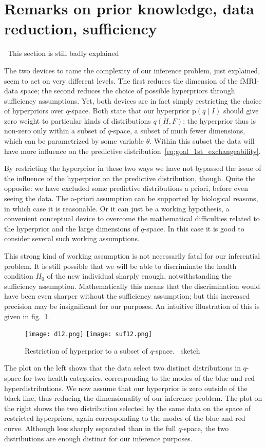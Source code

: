\documentclass[\ifafour a4paper,12pt,\else a5paper,10pt,\fi%
onecolumn,oneside,article,%
british%
]{memoir}
\theoremstyle{remark}
\theoremstyle{innote}
\newcommand*{\pf}{\mathrm{p}}%
\renewcommand*{\|}{\mathpunct{|}}
\newcommand*{\fig}{fig.}%
\newcommand*{\puzzle}{\maltese}
\newcommand{\mynote}[1]{ {\footnotesize\color{notecolour}\puzzle\ #1} }
\newcommand*{\yH}{H}
\newcommand*{\yF}{F}
\newcommand*{\yp}{q}
\newcommand*{\yt}{\theta}
\newcommand*{\yI}{I}
\theoremstyle{plain}
\begin{document}
\section{Remarks on prior knowledge, data reduction, sufficiency}
\label{sec:data_prior_model}

\mynote{This section is still badly explained}

The two devices to tame the complexity of our inference problem, just
explained, seem to act on very different levels. The first reduces the
dimension of the fMRI-data space; the second reduces the choice of
possible hyperpriors through sufficiency assumptions. Yet, both devices are
in fact simply restricting the choice of hyperpriors over $\yp$-space. Both
state that our hyperprior $\pf(\yp \|\yI)$ should give zero weight to
particular kinds of distributions $\yp(\yH, \yF)$; the hyperprior thus is
non-zero only within a subset of $\yp$-space, a subset of much fewer
dimensions, which can be parametrized by some variable $\yt$. Within this
subset the data will have more influence on the predictive
distribution~\eqref{eq:goal_1st_exchangeability}.

By restricting the hyperprior in these two ways we have not bypassed the
issue of the influence of the hyperprior on the predictive distribution,
though. Quite the opposite: we have excluded some predictive distributions
a priori, before even seeing the data. The a-priori assumption can be
supported by biological reasons, in which case it is reasonable. Or it can
just be a working hypothesis, a convenient conceptual device to overcome
the mathematical difficulties related to the hyperprior and the large
dimensions of $\yp$-space. In this case it is good to consider several such
working assumptions.

This strong kind of working assumption is not necessarily fatal for our
inferential problem. It is still possible that we will be able to
discriminate the health condition $\yH_0$ of the new individual sharply
enough, notwithstanding the sufficiency assumption. Mathematically this
means that the discrimination would have been even sharper without the
sufficiency assumption; but this increased precision may be insignificant
for our purposes. An intuitive illustration of this is given in
\fig~\ref{restriction_hyperprior}.
\begin{figure}[!b]
  \centering
\texttt{[image: d12.png]}%
\texttt{[image: suf12.png]}%
\caption{Restriction of hyperprior to a subset of $\yp$-space.\mynote{sketch}}
\label{restriction_hyperprior}
\end{figure}
The plot on the left shows that the data
select two distinct distributions in $\yp$-space for two health categories,
corresponding to the modes of the blue and red hyperdistributions. We now
assume that our hyperprior is zero outside of the black line, thus reducing
the dimensionality of our inference problem. The plot on the right shows
the two distribution selected by the same data on the space of restricted
hyperpriors, again corresponding to the modes of the blue and red curve.
Although less sharply separated than in the full $\yp$-space, the two
distributions are enough distinct for our inference purposes.
\end{document}

